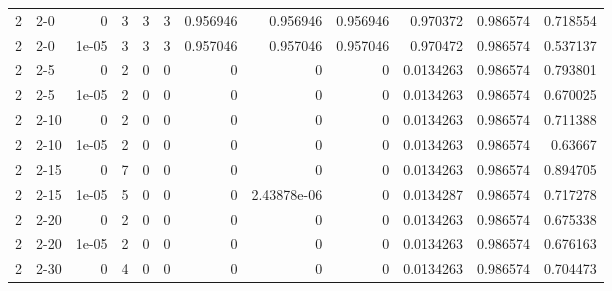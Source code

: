 \begin{tabular}{rlrrrrrrrrrr}
     2 & 2-0    &      0     &           3 &                 3 &                 3 &     0.956946    &     0.956946    &      0.956946    &        0.970372  &               0.986574 &           0.718554 \\
     2 & 2-0    &      1e-05 &           3 &                 3 &                 3 &     0.957046    &     0.957046    &      0.957046    &        0.970472  &               0.986574 &           0.537137 \\
     2 & 2-5    &      0     &           2 &                 0 &                 0 &     0           &     0           &      0           &        0.0134263 &               0.986574 &           0.793801 \\
     2 & 2-5    &      1e-05 &           2 &                 0 &                 0 &     0           &     0           &      0           &        0.0134263 &               0.986574 &           0.670025 \\
     2 & 2-10   &      0     &           2 &                 0 &                 0 &     0           &     0           &      0           &        0.0134263 &               0.986574 &           0.711388 \\
     2 & 2-10   &      1e-05 &           2 &                 0 &                 0 &     0           &     0           &      0           &        0.0134263 &               0.986574 &           0.63667  \\
     2 & 2-15   &      0     &           7 &                 0 &                 0 &     0           &     0           &      0           &        0.0134263 &               0.986574 &           0.894705 \\
     2 & 2-15   &      1e-05 &           5 &                 0 &                 0 &     0           &     2.43878e-06 &      0           &        0.0134287 &               0.986574 &           0.717278 \\
     2 & 2-20   &      0     &           2 &                 0 &                 0 &     0           &     0           &      0           &        0.0134263 &               0.986574 &           0.675338 \\
     2 & 2-20   &      1e-05 &           2 &                 0 &                 0 &     0           &     0           &      0           &        0.0134263 &               0.986574 &           0.676163 \\
     2 & 2-30   &      0     &           4 &                 0 &                 0 &     0           &     0           &      0           &        0.0134263 &               0.986574 &           0.704473 \\

\end{tabular}
